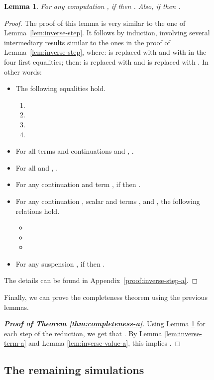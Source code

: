 \documentclass{LMCS}
\newtheorem{lemma}[theorem]{Lemma}
\newcommand{\App}[1]{The details can be found in Appendix~\ref{proof:#1}}
\begin{document}
\begin{figure}
{\begin{lemma}
  \label{lem:inverse-step-a} For any computation , if 
  then . Also, if 
  then .
\end{lemma}
\begin{proof}
  The proof of this lemma is very similar to the one of
  Lemma~\ref{lem:inverse-step}. It follows by induction, involving several
  intermediary results similar to the ones in the proof of
  Lemma~\ref{lem:inverse-step}, where:  is replaced with
   and  with  in the four first equalities; then:
   is replaced with  and  is
  replaced with . In other words:
  \begin{itemize}
    \item  The following equalities hold.
      \begin{enumerate}
	\item {}
	\item 
	\item {}
	\item 
      \end{enumerate}
    \item For all terms  and continuations
       and , 
      .
    \item For all  and
      , .
    \item For any continuation  and term
      , if  then .
    \item For any continuation , scalar  and terms , 
      and , the following relations hold.
      \begin{itemize}
	\item 
	\item 
	\item 
      \end{itemize}
    \item For any suspension , if 
      then .
  \end{itemize}
  \App{inverse-step-a}.
\end{proof}

Finally, we can prove the completeness theorem using the previous lemmas.

\begin{proof}[\bf Proof of Theorem \ref{thm:completeness-a}]
  Using Lemma \ref{lem:inverse-step-a} for each step of the reduction,
  we get that . By Lemma
  \ref{lem:inverse-term-a} and Lemma \ref{lem:inverse-value-a}, this
  implies .
\end{proof}


\subsection{The remaining simulations}\label{subsec:compose}

}
\end{figure}
\end{document}
